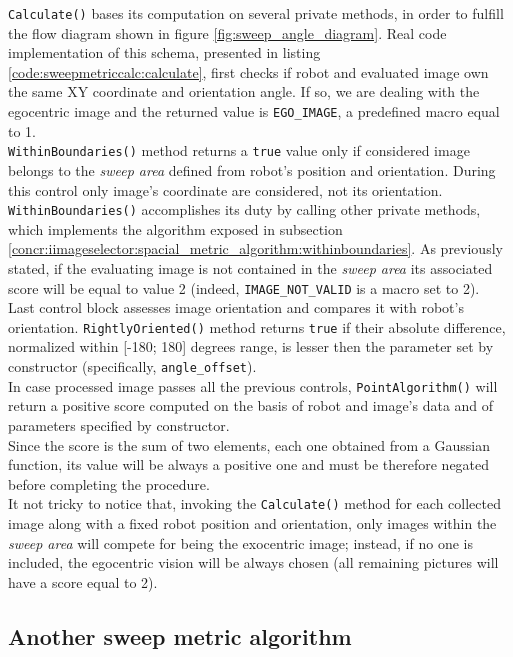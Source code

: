 \texttt{Calculate()} bases its computation on several private
methods, in order to fulfill the flow diagram shown in
figure \ref{fig:sweep_angle_diagram}. Real code implementation
of this schema, presented in listing
\ref{code:sweepmetriccalc:calculate}, first checks if robot
and evaluated image own the same XY coordinate and orientation
angle. If so, we are dealing with the egocentric image and
the returned value is \texttt{EGO\_IMAGE}, a predefined macro
equal to 1.
\\
\texttt{WithinBoundaries()} method returns a \texttt{true}
value only if considered image belongs to the \textit{sweep
area} defined from robot's position and orientation. During
this control only image's coordinate are considered, not its
orientation.
\\
\texttt{WithinBoundaries()}
accomplishes its duty by calling other private methods, which
implements the algorithm exposed in subsection
\ref{concr:iimageselector:spacial_metric_algorithm:withinboundaries}.
As previously stated, if the evaluating image is not contained
in the \textit{sweep area} its associated score will be equal
to value 2 (indeed, \texttt{IMAGE\_NOT\_VALID} is a macro
set to 2).
\\
Last control block assesses image orientation and compares it
with robot's orientation. \texttt{RightlyOriented()} method
returns \texttt{true} if their absolute difference, normalized
within [-180; 180] degrees range, is lesser then the parameter
set by constructor (specifically, \texttt{angle\_offset}).
\\
In case processed image passes all the previous controls,
\texttt{PointAlgorithm()} will return a positive score computed
on the basis of robot and image's data and
of parameters specified by constructor.
\\
Since the score is the sum of two elements, each one obtained
from a Gaussian function, its value will be always a
positive one and must be therefore 
negated before completing the procedure.
\\
It not tricky to notice that, invoking the \texttt{Calculate()}
method for each collected image along with a fixed robot
position and orientation, only images within the \textit{sweep
area} will compete for being the exocentric image; instead, if no
one is included, the egocentric vision will be always chosen
(all remaining pictures will have a score equal to 2).

\subsection{Another sweep metric algorithm}
\label{concr:iimageselector:another_sweep_metric_algorithm}


